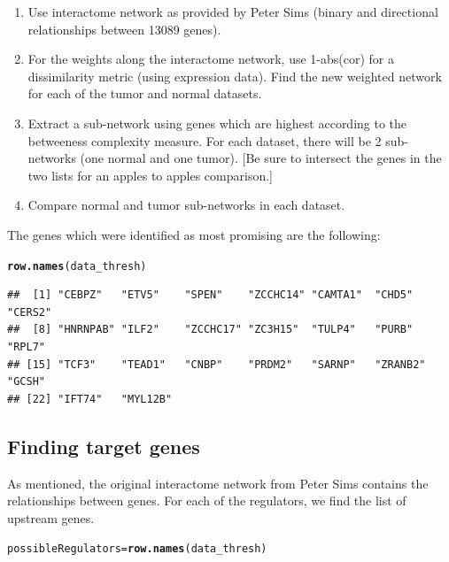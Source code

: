 \documentclass{article}\usepackage[]{graphicx}\usepackage[]{color}
\makeatletter
\newcommand{\hlstd}[1]{\textcolor[rgb]{0.345,0.345,0.345}{#1}}%
\newcommand{\hlkwb}[1]{\textcolor[rgb]{0.69,0.353,0.396}{#1}}%
\newcommand{\hlkwd}[1]{\textcolor[rgb]{0.737,0.353,0.396}{\textbf{#1}}}%
\newenvironment{kframe}{%
 \def\at@end@of@kframe{}%
 \ifinner\ifhmode%
  \def\at@end@of@kframe{\end{minipage}}%
  \begin{minipage}{\columnwidth}%
 \fi\fi%
 \def\FrameCommand##1{\hskip\@totalleftmargin \hskip-\fboxsep
 \colorbox{shadecolor}{##1}\hskip-\fboxsep
     \hskip-\linewidth \hskip-\@totalleftmargin \hskip\columnwidth}%
 \MakeFramed {\advance\hsize-\width
   \@totalleftmargin\z@ \linewidth\hsize
   \@setminipage}}%
 {\par\unskip\endMakeFramed%
 \at@end@of@kframe}
\newenvironment{knitrout}{}{} %
\makeatother
\begin{document}
\begin{enumerate}
\item
Use interactome network as provided by Peter Sims (binary and directional relationships between 13089 genes).
\item
For the weights along the interactome network, use 1-abs(cor) for a dissimilarity metric (using expression data).  Find the new weighted network for each of the tumor and normal datasets.
\item
Extract a sub-network using genes which are highest according to the betweeness complexity measure.  For each dataset, there will be 2 sub-networks (one normal and one tumor).  [Be sure to intersect the genes in the two lists for an apples to apples comparison.]
\item
Compare normal and tumor sub-networks in each dataset.
\end{enumerate}

The genes which were identified as most promising are the following:  

\begin{knitrout}\small
{}\color{fgcolor}\begin{kframe}
\begin{alltt}
\hlkwd{row.names}\hlstd{(data_thresh)}
\end{alltt}
\begin{verbatim}
##  [1] "CEBPZ"   "ETV5"    "SPEN"    "ZCCHC14" "CAMTA1"  "CHD5"    "CERS2"  
##  [8] "HNRNPAB" "ILF2"    "ZCCHC17" "ZC3H15"  "TULP4"   "PURB"    "RPL7"   
## [15] "TCF3"    "TEAD1"   "CNBP"    "PRDM2"   "SARNP"   "ZRANB2"  "GCSH"   
## [22] "IFT74"   "MYL12B"
\end{verbatim}
\end{kframe}
\end{knitrout}

\subsection{Finding target genes}

As mentioned, the original interactome network from Peter Sims contains the relationships between genes.  For each of the regulators, we find the list of upstream genes.
\begin{knitrout}\small
{}\color{fgcolor}\begin{kframe}
\begin{alltt}
\hlstd{possibleRegulators} \hlkwb{=} \hlkwd{row.names}\hlstd{(data_thresh)}
\end{alltt}
\end{kframe}
\end{knitrout}
\end{document}
